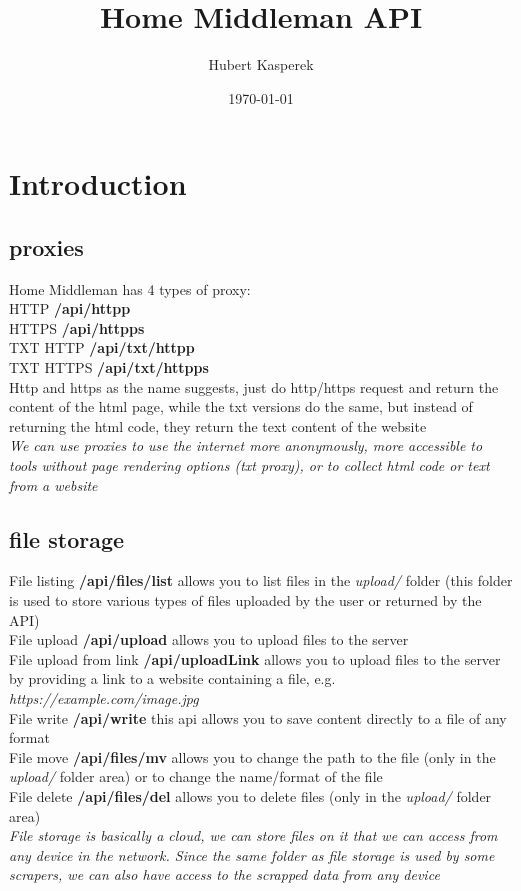\documentclass{article}
\begin{document}
\title{Home Middleman API}
\author{Hubert Kasperek}
\date{\today}

\maketitle
\tableofcontents

\clearpage

\fancyhead[L]{\slshape\nouppercase{}}

\section{Introduction}

\subsection{proxies}
Home Middleman has 4 types of proxy:\\
HTTP \textbf{/api/httpp}\\
HTTPS \textbf{/api/httpps}\\
TXT HTTP \textbf{/api/txt/httpp}\\
TXT HTTPS \textbf{/api/txt/httpps}\\
Http and https as the name suggests, just do http/https request and return the content of the html page, while the txt versions do the same, but instead of returning the html code, they return the text content of the website\\
\textit{We can use proxies to use the internet more anonymously, more accessible to tools without page rendering options (txt proxy), or to collect html code or text from a website}
\subsection{file storage}
File listing \textbf{/api/files/list} allows you to list files in the \textit{upload/} folder (this folder is used to store various types of files uploaded by the user or returned by the API)\\
File upload \textbf{/api/upload} allows you to upload files to the server\\
File upload from link \textbf{/api/uploadLink} allows you to upload files to the server by providing a link to a website containing a file, e.g. \textit{https://example.com/image.jpg}\\
File write \textbf{/api/write} this api allows you to save content directly to a file of any format\\
File move \textbf{/api/files/mv} allows you to change the path to the file (only in the \textit{upload/} folder area) or to change the name/format of the file\\
File delete \textbf{/api/files/del} allows you to delete files (only in the \textit{upload/} folder area)\\
\textit{File storage is basically a cloud, we can store files on it that we can access from any device in the network. Since the same folder as file storage is used by some scrapers, we can also have access to the scrapped data from any device}
\end{document}

